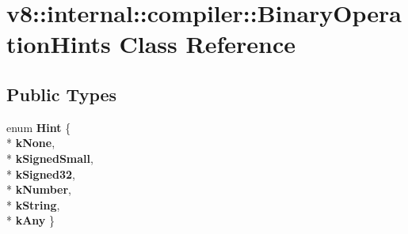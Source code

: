 \hypertarget{classv8_1_1internal_1_1compiler_1_1_binary_operation_hints}{}\section{v8\+:\+:internal\+:\+:compiler\+:\+:Binary\+Operation\+Hints Class Reference}
\label{classv8_1_1internal_1_1compiler_1_1_binary_operation_hints}
\subsection*{Public Types}
\begin{DoxyCompactItemize}
\item 
enum {\bfseries Hint} \{ \\*
{\bfseries k\+None}, 
\\*
{\bfseries k\+Signed\+Small}, 
\\*
{\bfseries k\+Signed32}, 
\\*
{\bfseries k\+Number}, 
\\*
{\bfseries k\+String}, 
\\*
{\bfseries k\+Any}
 \}\hypertarget{classv8_1_1internal_1_1compiler_1_1_binary_operation_hints_a606f112cf031e789aba9afe5c5bca089}{}\label{classv8_1_1internal_1_1compiler_1_1_binary_operation_hints_a606f112cf031e789aba9afe5c5bca089}

\end{DoxyCompactItemize}
